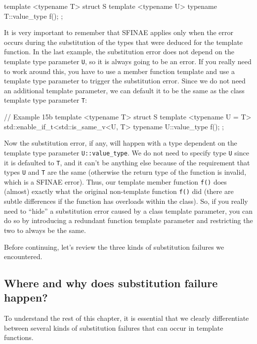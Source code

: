 \begin{code}
template <typename T> struct S {
  template <typename U> typename T::value_type f();
};
\end{code}

It is very important to remember that SFINAE applies only when the error occurs during the substitution of the types that were deduced for the template function. In the last example, the substitution error does not depend on the template type parameter \texttt{U}, so it is always going to be an error. If you really need to work around this, you have to use a member function template and use a template type parameter to trigger the substitution error. Since we do not need an additional template parameter, we can default it to be the same as the class template type parameter \texttt{T}:

\begin{code}
// Example 15b
template <typename T> struct S {
  template <typename U = T>
  std::enable_if_t<std::is_same_v<U, T>
  typename U::value_type f();
};
\end{code}

Now the substitution error, if any, will happen with a type dependent on the template type parameter \texttt{U::value\_type}. We do not need to specify type \texttt{U} since it is defaulted to \texttt{T}, and it can't be anything else because of the requirement that types \texttt{U} and \texttt{T} are the same (otherwise the return type of the function is invalid, which is a SFINAE error). Thus, our template member function \texttt{f()} does (almost) exactly what the original non-template function \texttt{f()} did (there are subtle differences if the function has overloads within the class). So, if you really need to ``hide'' a substitution error caused by a class template parameter, you can do so by introducing a redundant function template parameter and restricting the two to always be the same.

Before continuing, let's review the three kinds of substitution failures we encountered.

\subsection{Where and why does substitution failure happen?}

To understand the rest of this chapter, it is essential that we clearly differentiate between several kinds of substitution failures that can occur in template functions.

